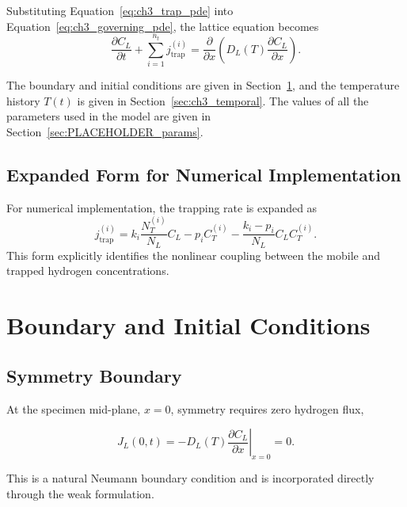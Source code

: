 \documentclass[a4paper,12pt,oneside]{report}
\begin{document}
Substituting Equation~\eqref{eq:ch3_trap_pde} into Equation~\eqref{eq:ch3_governing_pde}, the lattice equation becomes
\begin{equation}
\frac{\partial C_L}{\partial t}
+
\sum_{i=1}^{n_t}
j_{\mathrm{trap}}^{(i)}
=
\frac{\partial}{\partial x}
\left(
D_L(T)
\frac{\partial C_L}{\partial x}
\right).
\label{eq:ch3_lattice_pde}
\end{equation}

The boundary and initial conditions are given in Section~\ref{sec:ch3_bc}, and the temperature history $T(t)$ is given in Section~\ref{sec:ch3_temporal}. The values of all the parameters used in the model are given in Section~\ref{sec:PLACEHOLDER_params}.

\subsection{Expanded Form for Numerical Implementation}

For numerical implementation, the trapping rate is expanded as
\begin{equation}
j_{\mathrm{trap}}^{(i)}
=
k_i\frac{N_T^{(i)}}{N_L}C_L
-p_iC_T^{(i)}
-
\frac{k_i-p_i}{N_L}
C_LC_T^{(i)}.
\label{eq:ch3_mf_expanded}
\end{equation}
This form explicitly identifies the nonlinear coupling between the mobile and trapped hydrogen concentrations.

\section{Boundary and Initial Conditions}
\label{sec:ch3_bc}

\subsection{Symmetry Boundary}

At the specimen mid-plane, $x=0$, symmetry requires zero hydrogen
flux,

\begin{equation}
J_L(0,t)
=
-D_L(T)
\left.
\frac{\partial C_L}{\partial x}
\right|_{x=0}
=
0.
\label{eq:ch3_symmetry}
\end{equation}

This is a natural Neumann boundary condition and is incorporated
directly through the weak formulation.
\end{document}
